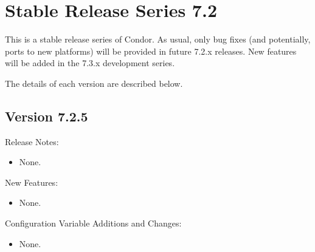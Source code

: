 
\section{\label{sec:History-7-2}Stable Release Series 7.2}

This is a stable release series of Condor.
As usual, only bug fixes (and potentially, ports to new platforms)
will be provided in future 7.2.x releases.
New features will be added in the 7.3.x development series.

The details of each version are described below.

\subsection*{\label{sec:New-7-2-5}Version 7.2.5}

\noindent Release Notes:

\begin{itemize}

\item None.

\end{itemize}


\noindent New Features:

\begin{itemize}

\item None.

\end{itemize}

\noindent Configuration Variable Additions and Changes:

\begin{itemize}

\item None.

\end{itemize}

